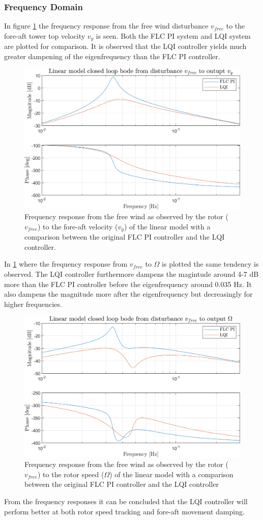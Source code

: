 \subsubsection{Frequency Domain}
In figure \cref{fig:app_script_vfreeTovy} the frequency response from the free wind disturbance $ v_{free} $ to the fore-aft tower top velocity $ v_y $ is seen. Both the FLC PI system and LQI system are plotted for comparison. It is observed that the LQI controller yields much greater dampening of the eigenfrequency than the FLC PI controller.
\begin{figure}[ht]
	\centering
	\includegraphics[width=0.7\linewidth]{Graphics/TestResults/linearModPerf/script_vfreeTovy.png}
	\caption{Frequency response from the free wind as observed by the rotor ($ v_{free} $) to the fore-aft velocity ($ v_y $) of the linear model with a comparison between the original FLC PI controller and the LQI controller.}
	\label{fig:app_script_vfreeTovy}
\end{figure}
In \cref{fig:app_script_vfreeTovy} where the frequency response from $ v_{free} $ to $ \Omega $ is plotted the same tendency is observed. The LQI controller furthermore dampens the magintude around 4-7 dB more than the FLC PI controller before the eigenfrequency around 0.035 Hz. It also dampens the magnitude more after the eigenfrequency but decreasingly for higher frequencies.
\begin{figure}[ht]
	\centering
	\includegraphics[width=0.7\linewidth]{Graphics/TestResults/linearModPerf/script_vfreeToW.png}
	\caption{Frequency response from the free wind as observed by the rotor ($ v_{free} $) to the rotor speed ($ \Omega $) of the linear model with a comparison between the original FLC PI controller and the LQI controller}
	\label{fig:app_script_vfreeToW}
\end{figure}
From the frequency responses it can be concluded that the LQI controller will perform better at both rotor speed tracking and fore-aft movement damping. 

